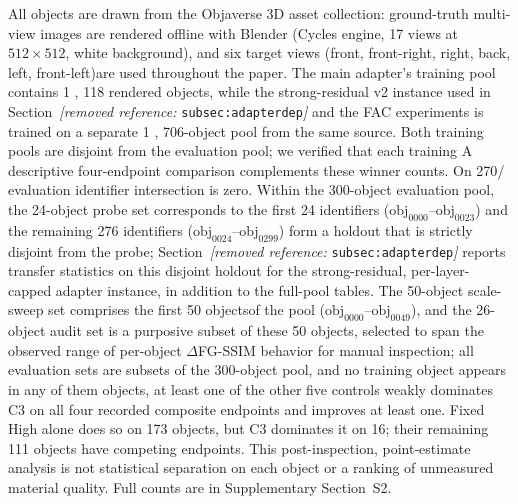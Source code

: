 \documentclass[times,twocolumn,final]{elsarticle}
\providecommand{\DIFadd}[1]{{\protect\color{blue} \sf #1}} %
\providecommand{\DIFdel}[1]{{\protect\color{red} \scriptsize #1}} %
\providecommand{\DIFaddbegin}{} %
\providecommand{\DIFaddend}{} %
\providecommand{\DIFdelbegin}{} %
\providecommand{\DIFdelend}{} %
\begin{document}
\DIFdelbegin \DIFdel{All objects are drawn from the Objaverse 3D asset collection: ground-truth multi-view images are rendered offline with Blender (Cycles engine, 17 views at $512\times512$, white background), and six target views (front, front-right, right, back, left, front-left)are used throughout the paper. The main adapter's training pool contains 1}%
\DIFdel{,}%
\DIFdel{118 rendered objects, while the strong-residual v2 instance used in Section~\textit{[removed reference: }\texttt{subsec:adapterdep}\textit{]} and the FAC experiments is trained on a separate 1}%
\DIFdel{, }%
\DIFdel{706-object pool from the same source. Both training pools are disjoint from the evaluation pool; we verified that each training}\DIFdelend \DIFaddbegin \DIFadd{A descriptive four-endpoint comparison complements these winner counts. On 270}\DIFaddend /\DIFdelbegin \DIFdel{evaluation identifier intersection is zero. Within the 300-object evaluation pool, the 24-object probe set corresponds to the first 24 identifiers ($\mathrm{obj}_{0000}$--$\mathrm{obj}_{0023}$) and the remaining 276 identifiers ($\mathrm{obj}_{0024}$--$\mathrm{obj}_{0299}$) form a holdout that is strictly disjoint from the probe; Section~\textit{[removed reference: }\texttt{subsec:adapterdep}\textit{]} reports transfer statistics on this disjoint holdout for the strong-residual, per-layer-capped adapter instance, in addition to the full-pool tables.
The 50-object scale-sweep set comprises the first 50 objectsof the pool ($\mathrm{obj}_{0000}$--$\mathrm{obj}_{0049}$), and the 26-object audit set is a purposive subset of these 50 objects, selected to span the observed range of per-object $\Delta$FG-SSIM behavior for manual inspection; all evaluation sets are subsets of the 300-object pool, and no training object appears in any of them}\DIFdelend \DIFaddbegin \DIFadd{300 objects, at least one of the other five controls weakly dominates C3 on all four recorded composite endpoints and improves at least one. Fixed High alone does so on 173 objects, but C3 dominates it on 16; their remaining 111 objects have competing endpoints. This post-inspection, point-estimate analysis is not statistical separation on each object or a ranking of unmeasured material quality. Full counts are in Supplementary Section~S2}\DIFaddend .
\end{document}
